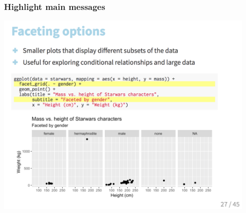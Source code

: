 \documentclass{beamer}
\begin{document}

\begin{frame}
\frametitle{Highlight main messages}

\begin{center}
\includegraphics[width = 0.95\textwidth]{figures/highlighting}
\end{center}

\vfill

\end{frame}

\end{document}
